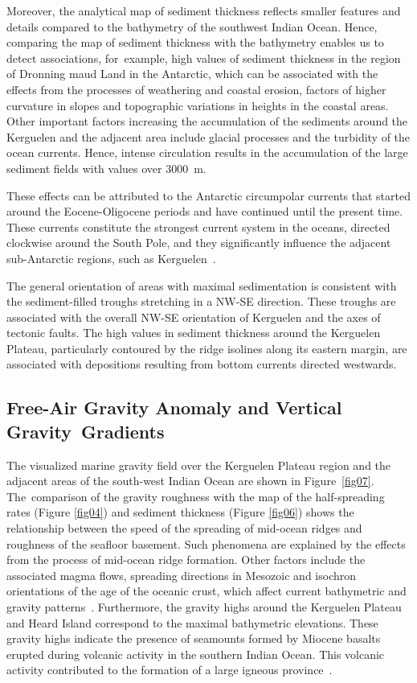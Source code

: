 \documentclass[geomatics,article,accept,pdftex,moreauthors]{Definitions/mdpi}
\begin{document}
Moreover, the analytical map of sediment thickness reflects smaller features and details compared to the bathymetry of the southwest Indian Ocean. Hence, comparing the map of sediment thickness with the bathymetry enables us to detect associations, for~example, high values of sediment thickness in the region of  Dronning maud Land in the Antarctic, which can be associated with the effects from the processes of weathering and coastal erosion, factors of higher curvature in slopes and topographic variations in heights in the coastal areas. Other important factors increasing the accumulation of the sediments around the Kerguelen and the adjacent area include glacial processes and the turbidity of the ocean currents. Hence, intense circulation results in the accumulation of the large sediment fields with values over 3000~m. 

These effects can be attributed to the Antarctic circumpolar currents that started around the Eocene-Oligocene periods and have continued until the present time. These currents constitute the strongest current system in the oceans, directed clockwise around the South Pole, and they significantly influence the adjacent sub-Antarctic regions, such as Kerguelen~\cite{Huang,ROBERT200237}.

The general orientation of areas with maximal sedimentation is consistent with the sediment-filled troughs stretching in a NW-SE direction. These troughs are associated with the overall NW-SE orientation of Kerguelen and the axes of tectonic faults. The high values in sediment thickness around the Kerguelen Plateau, particularly contoured by the ridge isolines along its eastern margin, are associated with depositions resulting from bottom currents directed westwards. %

\subsection{Free-Air Gravity Anomaly and Vertical Gravity~Gradients}

The visualized marine gravity field over the Kerguelen Plateau region and the adjacent areas of the south-west Indian Ocean are shown in Figure~\ref{fig07}. The~comparison of the gravity roughness with the map of the half-spreading rates (Figure \ref{fig04}) and sediment thickness (Figure \ref{fig06}) shows the relationship between the speed of the spreading of mid-ocean ridges and roughness of the seafloor basement. Such phenomena are explained by the effects from the process of mid-ocean ridge formation. Other factors include the associated magma flows, spreading directions in Mesozoic and isochron orientations of the age of the oceanic crust, which affect current bathymetric and gravity patterns~\cite{Whittaker}. Furthermore, the gravity highs around the Kerguelen Plateau and Heard Island correspond to the maximal bathymetric elevations. These gravity highs indicate the presence of seamounts formed by Miocene basalts erupted during volcanic activity in the southern Indian Ocean. This volcanic activity contributed to the formation of a large igneous province~\cite{Weis}.
\end{document}

